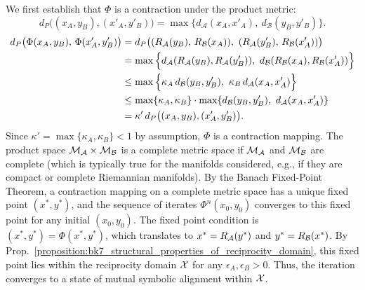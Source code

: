 \begin{demonstratio}
\label{demonstratio:bk7_joint_reflection_contraction}
We first establish that \( \Phi \) is a contraction under the product metric:
\[
d_P\big((x_A, y_B), (x'_A, y'_B)\big) 
= \max\big\{ d_{\mathcal{A}}(x_A, x'_A),\ d_{\mathcal{B}}(y_B, y'_B) \big\}.
\]
\begin{align*}
d_P\big(\Phi(x_A, y_B),\, \Phi(x'_A, y'_B)\big)
&= d_P\big(
  (\reflect_{\mathcal{A}}(y_B),\, \reflect_{\mathcal{B}}(x_A)),\ 
  (\reflect_{\mathcal{A}}(y'_B),\, \reflect_{\mathcal{B}}(x'_A))
\big) \\
&= \max\Big\{ 
  d_{\mathcal{A}}(\reflect_{\mathcal{A}}(y_B), \reflect_{\mathcal{A}}(y'_B)),\ 
  d_{\mathcal{B}}(\reflect_{\mathcal{B}}(x_A), \reflect_{\mathcal{B}}(x'_A)) 
\Big\} \\
&\le \max\Big\{ 
  \kappa_A\, d_{\mathcal{B}}(y_B, y'_B),\ 
  \kappa_B\, d_{\mathcal{A}}(x_A, x'_A) 
\Big\} \\
&\le \max\{\kappa_A, \kappa_B\} 
    \cdot \max\{ d_{\mathcal{B}}(y_B, y'_B),\ d_{\mathcal{A}}(x_A, x'_A) \} \\
&= \kappa'\, d_P\big((x_A, y_B), (x'_A, y'_B)\big).
\end{align*}
Since \( \kappa' = \max\{\kappa_A, \kappa_B\} < 1 \) by assumption, \( \Phi \) is a contraction mapping.
The product space \(\mathcal{M}_{\mathcal{A}}\times\mathcal{M}_{\mathcal{B}}\) is a complete metric space if \(\mathcal{M}_{\mathcal{A}}\) and \(\mathcal{M}_{\mathcal{B}}\) are complete (which is typically true for the manifolds considered, e.g., if they are compact or complete Riemannian manifolds).
By the Banach Fixed-Point Theorem, a contraction mapping on a complete metric space has a unique fixed point \((x^{\ast}, y^{\ast})\), and the sequence of iterates \(\Phi^n(x_0, y_0)\) converges to this fixed point for any initial \((x_0, y_0)\). The fixed point condition is \((x^{\ast}, y^{\ast}) = \Phi(x^{\ast}, y^{\ast})\), which translates to \(x^{\ast} = R_{\mathcal{A}}(y^{\ast})\) and \(y^{\ast} = R_{\mathcal{B}}(x^{\ast})\). By Prop.~\ref{proposition:bk7_structural_properties_of_reciprocity_domain}, this fixed point lies within the reciprocity domain \(\mathcal{X}\) for any \(\epsilon_A, \epsilon_B > 0\). Thus, the iteration converges to a state of mutual symbolic alignment within \(\mathcal{X}\).

\end{demonstratio}
